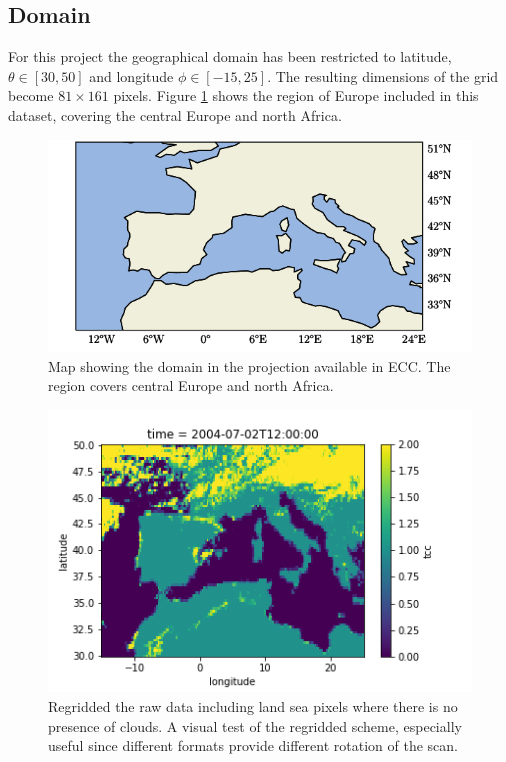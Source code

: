 \subsection{Domain}
For this project the geographical domain has been restricted to latitude, $\theta \in[30,50]$ and longitude $\phi \in [-15, 25]$. The resulting dimensions of the grid become $81\times161$ pixels. Figure \ref{fig:map} shows the region of Europe included in this dataset, covering the central Europe and north Africa.

\begin{figure}[h]
    \centering
    \includegraphics[scale = 1.0]{python_figs/Domain.png}
    \caption[Map over domain.]{Map showing the domain in the projection available in ECC. The region covers central Europe and north Africa.}
    \label{fig:map}
\end{figure}

\begin{figure}
    \centering
    \includegraphics{Chapter4_Results/figurs/regridded_raw_satelite_image_to_make_sure_its_correcxt_area.png}
    \caption{Regridded the raw data including land sea pixels where there is no presence of clouds. A visual test of the regridded scheme, especially useful since different formats provide different rotation of the scan.}
    \label{fig:correct_area}
\end{figure}

